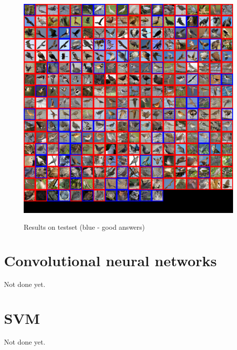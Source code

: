 \documentclass[a4paper]{article}
\begin{document}
\begin{figure}[h]
    \caption[]{Results on testset (blue - good answers)}
    \centering
    \includegraphics[page=2,width=1.0\textwidth]{eval.png}
    \label{fig:eval}
\end{figure}


\section{Convolutional neural networks}
Not done yet.

\section{SVM}
Not done yet.
\end{document}
